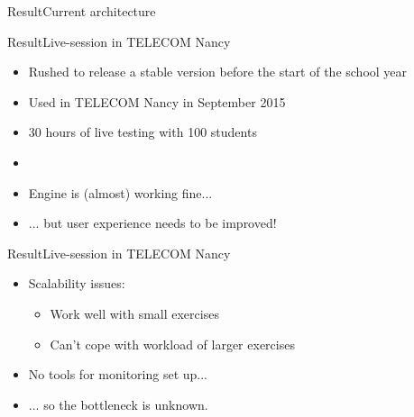 \documentclass{beamer}
\begin{document}
\begin{frame}{Result}{Current architecture}
\begin{center}
  \end{center}
\end{frame}

\begin{frame}{Result}{Live-session in TELECOM Nancy}
  \begin{itemize}
  \item {
    Rushed to release a stable version before the start of the school year
  }
  \item {
    Used in TELECOM Nancy in September 2015
  }
  \item {
    30 hours of live testing with 100 students
    \pause
  }
  \item[~]
  \item {
    Engine is (almost) working fine...
  }
  \item {
    ... but user experience needs to be improved!
  }
  \end{itemize}
\end{frame}


\begin{frame}{Result}{Live-session in TELECOM Nancy}
  \begin{itemize}
  \item {
    Scalability issues:
    \begin{itemize}
    \item Work well with small exercises
    \item Can't cope with workload of larger exercises
    \end{itemize}
    \pause
  }
  \item {
    No tools for monitoring set up...
    \pause
  }
  \item {
    ... so the bottleneck is unknown.
  }
  \end{itemize}
\end{frame}
\end{document}
